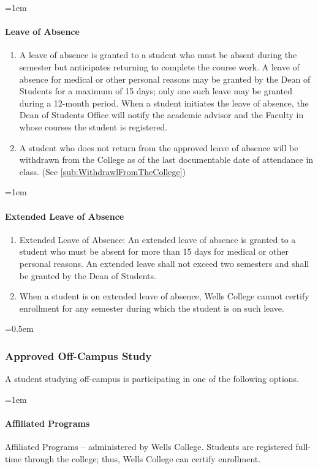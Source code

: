 \documentclass{manual}
\newcommand{\modified}[1]{}
\newcommand{\oldbreak}[1]{}
\let\oldsubsubsection\subsubsection
\renewcommand\subsubsection{\leftskip=0.5em\oldsubsubsection}
\let\oldparagraph\paragraph
\renewcommand\paragraph{\leftskip=1em\oldparagraph}
\begin{document}
\paragraph{Leave of Absence} \modified{5/9/95}

\begin{enumerate}[label=\alph*)]
\item A leave of absence is granted to a student who must be absent during the semester but anticipates returning to complete the course work. A leave of absence for medical or other personal reasons may be granted by the Dean of Students for a maximum of 15 days; only one such leave may be granted during a 12-month period. When a student initiates the leave of absence, the Dean of Students Office will notify the academic advisor and the Faculty in whose courses the student is registered.
\item A student who does not return from the approved leave of absence will be withdrawn from the College as of the last documentable date of attendance in class. (See \cref{sub:WithdrawlFromTheCollege})
\end{enumerate}

\oldbreak{IX-1}

\paragraph{Extended Leave of Absence}

\begin{enumerate}[label=\alph*)]
\item Extended Leave of Absence: An extended leave of absence is granted to a student who must be absent for more than 15 days for medical or other personal reasons. An extended leave shall not exceed two semesters and shall be granted by the Dean of Students. 
\item When a student is on extended leave of absence, Wells College cannot certify enrollment for  any semester during which the student is on such leave.
\end{enumerate}

\subsubsection{Approved Off-Campus Study}

A student studying off-campus is participating in one of the following options.

\paragraph{Affiliated Programs}
Affiliated Programs -- administered by Wells College. Students are registered full-time through the college; thus, Wells College can certify enrollment.
\end{document}
